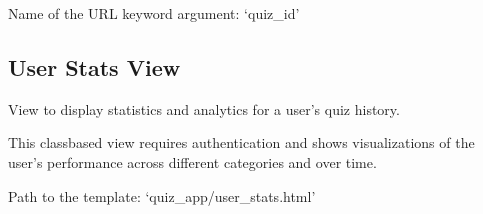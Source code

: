 \documentclass[letterpaper,10pt,english]{sphinxmanual}
\begin{document}
\begin{fulllineitems}
\begin{fulllineitems}
\end{fulllineitems}


\begin{fulllineitems}
\label{\detokenize{views:ResultsView.pk_url_kwarg}}
\pysigstartsignatures
{}
\pysigstopsignatures
\sphinxAtStartPar
Name of the URL keyword argument: ‘quiz\_id’

\end{fulllineitems}


\end{fulllineitems}



\subsection{User Stats View}
\label{\detokenize{views:user-stats-view}}

\begin{fulllineitems}
\label{\detokenize{views:UserStatsView}}
\pysigstartsignatures
{}
\pysigstopsignatures
\sphinxAtStartPar
View to display statistics and analytics for a user’s quiz history.

\sphinxAtStartPar
This class\sphinxhyphen{}based view requires authentication and shows visualizations
of the user’s performance across different categories and over time.

\begin{fulllineitems}
\label{\detokenize{views:UserStatsView.template_name}}
\pysigstartsignatures
{}
\pysigstopsignatures
\sphinxAtStartPar
Path to the template: ‘quiz\_app/user\_stats.html’

\end{fulllineitems}


\end{fulllineitems}
\end{document}
